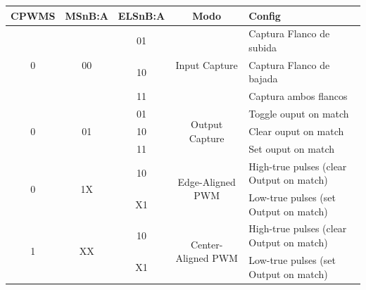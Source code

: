 \documentclass[10.5pt,scale=1.0,t,aspectratio=169,hyperref={pdfpagelabels=false}]{beamer}
\begin{document}
\begin{frame}
{\begin{columns}
			{\tiny
			\begin{table}[]
				\begin{tabular}{ccccp{2cm}}
					\hline
					\textbf{CPWMS} & \textbf{MSnB:A} & \textbf{ELSnB:A} & \textbf{Modo} & \textbf{Config} \\
					\hline
					\multirow{3}{*}{0} & \multirow{3}{*}{00}      & 01 & \multirow{3}{*}{Input Capture} & Captura Flanco de subida   \\
					& & 10 &                       & Captura Flanco de bajada   \\
					& & 11 &                       & Captura ambos flancos  \\
					\hline
					\multirow{3}{*}{0} & \multirow{3}{*}{01}      & 01 & \multirow{3}{*}{Output Capture} & Toggle ouput on match   \\
					& & 10 &                       & Clear ouput on match   \\
					& & 11 &                       & Set ouput on match  \\
					\hline
					\multirow{2}{*}{0} & \multirow{2}{*}{1X}      & 10 & \multirow{2}{*}{Edge-Aligned
						PWM} & High-true pulses (clear Output on match)   \\
					& & X1 &   & Low-true pulses (set Output on
					match) \\
					\hline
					\multirow{2}{*}{1} & \multirow{2}{*}{XX}      & 10 & \multirow{2}{*}{Center-Aligned
						PWM} & High-true pulses (clear Output on match)   \\
					& & X1 &   & Low-true pulses (set Output on
					match) \\
					\hline
				\end{tabular}
			\end{table}
			}
		\end{columns}	
	}
\end{frame}
\end{document}
